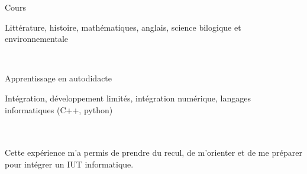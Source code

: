 \documentclass[a4paper,10pt, french]{article}
\begin{document}
\noindent
\begin{minipage}{0.20\textwidth}
	\color{MyGray} Cours
\end{minipage}
\hfill
\begin{minipage}{0.70\textwidth}
	Littérature, histoire, mathématiques, anglais, science bilogique et environnementale
\end{minipage}\\
\vspace{2mm}

\noindent
\begin{minipage}{0.20\textwidth}
	\color{MyGray} Apprentissage en autodidacte
\end{minipage}
\hfill
\begin{minipage}{0.70\textwidth}
	Intégration, développement limités, intégration numérique, langages informatiques (C++, python)
\end{minipage}\\
\vspace{2mm}

\paragraph{} Cette expérience m'a permis de prendre du recul, de m'orienter et de me préparer pour intégrer un IUT informatique.
\end{document}
